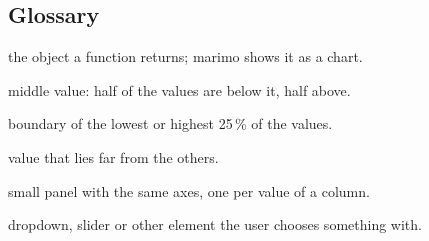\documentclass[11pt,a4paper]{article}
\begin{document}
\subsection*{Glossary}

\begin{description}[leftmargin=3.2cm, labelwidth=3.0cm, font=\normalfont\bfseries]
  \item[figure] the object a  function returns; marimo shows it as a chart.
  \item[median] middle value: half of the values are below it, half above.
  \item[quartile] boundary of the lowest or highest 25\,\% of the values.
  \item[outlier] value that lies far from the others.
  \item[facet] small panel with the same axes, one per value of a column.
  \item[UI element] dropdown, slider or other element the user chooses something with.
\end{description}
\end{document}
